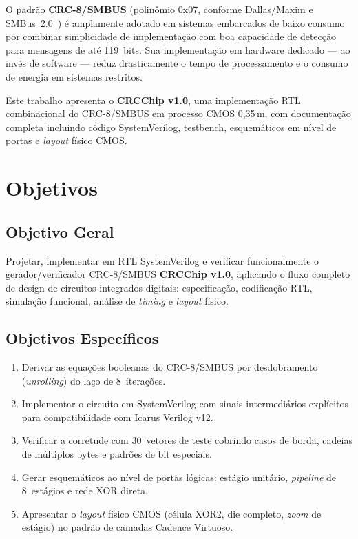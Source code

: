 \documentclass[12pt,a4paper]{article}
\begin{document}
O padrão \textbf{CRC-8/SMBUS} (polinômio 0x07, conforme Dallas/Maxim e SMBus~2.0~\cite{smbus}) é amplamente adotado em sistemas embarcados de baixo consumo por combinar simplicidade de implementação com boa capacidade de detecção para mensagens de até 119~bits. Sua implementação em hardware dedicado — ao invés de software — reduz drasticamente o tempo de processamento e o consumo de energia em sistemas restritos.

Este trabalho apresenta o \textbf{CRCChip v1.0}, uma implementação RTL combinacional do CRC-8/SMBUS em processo CMOS 0,35\,\textmu m, com documentação completa incluindo código SystemVerilog, testbench, esquemáticos em nível de portas e \textit{layout} físico CMOS.

\section{Objetivos}

\subsection{Objetivo Geral}

Projetar, implementar em RTL SystemVerilog e verificar funcionalmente o gerador/verificador CRC-8/SMBUS \textbf{CRCChip v1.0}, aplicando o fluxo completo de design de circuitos integrados digitais: especificação, codificação RTL, simulação funcional, análise de \textit{timing} e \textit{layout} físico.

\subsection{Objetivos Específicos}

\begin{enumerate}[leftmargin=2em,label=\textbf{OE\arabic*.}]
  \item Derivar as equações booleanas do CRC-8/SMBUS por desdobramento (\textit{unrolling}) do laço de 8~iterações.
  \item Implementar o circuito em SystemVerilog com sinais intermediários explícitos para compatibilidade com Icarus Verilog v12.
  \item Verificar a corretude com 30~vetores de teste cobrindo casos de borda, cadeias de múltiplos bytes e padrões de bit especiais.
  \item Gerar esquemáticos ao nível de portas lógicas: estágio unitário, \textit{pipeline} de 8~estágios e rede XOR direta.
  \item Apresentar o \textit{layout} físico CMOS (célula XOR2, die completo, \textit{zoom} de estágio) no padrão de camadas Cadence Virtuoso.
\end{enumerate}
\end{document}
